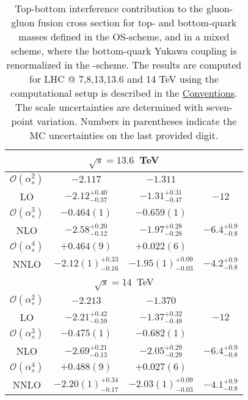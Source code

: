 \begin{table}
\begin{tabular}{cccc}
  \hline
  \hline
  \multicolumn{4}{c}{$\sqrt{s}=13.6$~TeV}\\
  \hline
  $\mathcal{O}(\alpha_s^2)$ & $-2.117$ & $-1.311$ & \\
  LO & $-2.12^{+0.40}_{-0.57}$ & $-1.31^{+0.31}_{-0.47}$ & $-12$ \\
  \hline
  $\mathcal{O}(\alpha_s^3)$ & $-0.464(1)$ & $-0.659(1)$ & \\
  NLO & $-2.58^{+0.20}_{-0.12}$ & $-1.97^{+0.28}_{-0.28}$ & $-6.4^{+0.9}_{-0.8}$ \\
  \hline
  $\mathcal{O}(\alpha_s^4)$ & $+0.464(9)$ & $+0.022(6)$ & \\
  NNLO & $-2.12(1)^{+0.33}_{-0.16}$ & $-1.95(1)^{+0.09}_{-0.03}$ & $-4.2^{+0.9}_{-0.8}$ \\
  \hline
  \hline
  \multicolumn{4}{c}{$\sqrt{s}=14$~TeV}\\
  \hline
  $\mathcal{O}(\alpha_s^2)$ & $-2.213$ & $-1.370$ & \\
  LO & $-2.21^{+0.42}_{-0.59}$ & $-1.37^{+0.32}_{-0.49}$ & $-12$ \\
  \hline
  $\mathcal{O}(\alpha_s^3)$ & $-0.475(1)$ & $-0.682(1)$ & \\
  NLO & $-2.69^{+0.21}_{-0.13}$ & $-2.05^{+0.29}_{-0.29}$ & $-6.4^{+0.9}_{-0.8}$ \\
  \hline
  $\mathcal{O}(\alpha_s^4)$ & $+0.488(9)$ & $+0.027(6)$ & \\
  NNLO & $-2.20(1)^{+0.34}_{-0.17}$ & $-2.03(1)^{+0.09}_{-0.03}$ & $-4.1^{+0.9}_{-0.8}$ \\
  \end{tabular}
  \caption{Top-bottom interference contribution to the gluon-gluon fusion cross section for top- and bottom-quark masses defined in the \acs{OS}-scheme, and in a mixed scheme, where the bottom-quark Yukawa coupling is renormalized in the \MS-scheme. The results are computed for LHC @ 7,8,13,13.6 and 14 TeV using the computational setup is described in the \hyperref[chap:notation_and_conventions]{Conventions}. The scale uncertainties are determined with seven-point variation. Numbers in parentheses indicate the \acs{MC} uncertainties on the last provided digit.}
  \label{tab:a3:t-b_OS}
\end{table}

